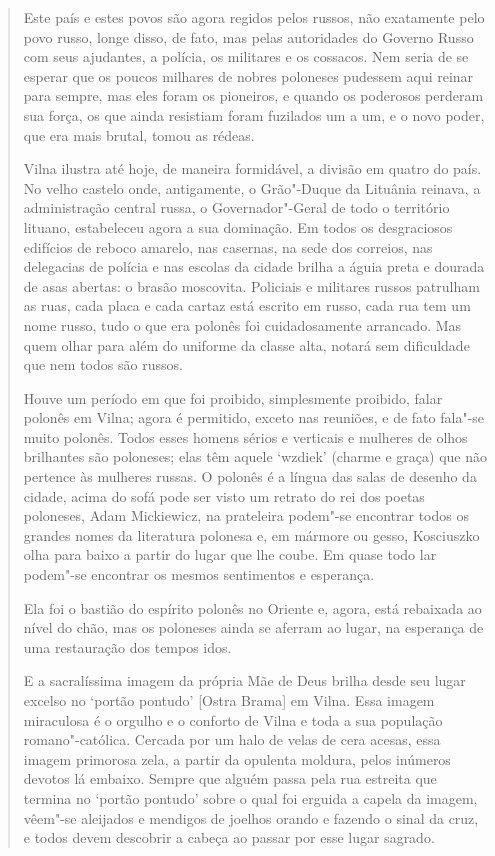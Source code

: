 \begin{quote}
Este país e estes povos são agora regidos pelos russos, não exatamente
pelo povo russo, longe disso, de fato, mas pelas autoridades do Governo
Russo com seus ajudantes, a polícia, os militares e os cossacos. Nem
seria de se esperar que os poucos milhares de nobres poloneses pudessem
aqui reinar para sempre, mas eles foram os pioneiros, e quando os
poderosos perderam sua força, os que ainda resistiam foram fuzilados um
a um, e o novo poder, que era mais brutal, tomou as rédeas.

Vilna ilustra até hoje, de maneira formidável, a divisão em quatro do
país. No velho castelo onde, antigamente, o Grão"-Duque da Lituânia
reinava, a administração central russa, o Governador"-Geral de todo o
território lituano, estabeleceu agora a sua dominação. Em todos os
desgraciosos edifícios de reboco amarelo, nas casernas, na sede dos
correios, nas delegacias de polícia e nas escolas da cidade brilha a
águia preta e dourada de asas abertas: o brasão moscovita. Policiais e
militares russos patrulham as ruas, cada placa e cada cartaz está
escrito em russo, cada rua tem um nome russo, tudo o que era polonês foi
cuidadosamente arrancado. Mas quem olhar para além do uniforme da classe
alta, notará sem dificuldade que nem todos são russos.

Houve um período em que foi proibido, simplesmente proibido, falar
polonês em Vilna; agora é permitido, exceto nas reuniões, e de fato
fala"-se muito polonês. Todos esses homens sérios e verticais e mulheres
de olhos brilhantes são poloneses; elas têm aquele `wzdiek' (charme e
graça) que não pertence às mulheres russas. O polonês é a língua das
salas de desenho da cidade, acima do sofá pode ser visto um retrato do
rei dos poetas poloneses, Adam Mickiewicz, na prateleira podem"-se
encontrar todos os grandes nomes da literatura polonesa e, em mármore ou
gesso, Kosciuszko olha para baixo a partir do lugar que lhe coube. Em
quase todo lar podem"-se encontrar os mesmos sentimentos e esperança.

Ela foi o bastião do espírito polonês no Oriente e, agora, está
rebaixada ao nível do chão, mas os poloneses ainda se aferram ao lugar,
na esperança de uma restauração dos tempos idos.

E a sacralíssima imagem da própria Mãe de Deus brilha desde seu lugar
excelso no `portão pontudo' {[}Ostra Brama{]} em Vilna. Essa imagem
miraculosa é o orgulho e o conforto de Vilna e toda a sua população
romano"-católica. Cercada por um halo de velas de cera acesas, essa
imagem primorosa zela, a partir da opulenta moldura, pelos inúmeros
devotos lá embaixo. Sempre que alguém passa pela rua estreita que
termina no `portão pontudo' sobre o qual foi erguida a capela da imagem,
vêem"-se aleijados e mendigos de joelhos orando e fazendo o sinal da
cruz, e todos devem descobrir a cabeça ao passar por esse lugar sagrado.


\end{quote}
